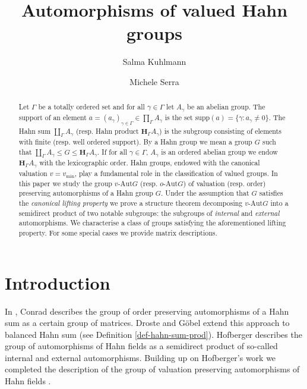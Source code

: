 \documentclass[12pt,a4paper,reqno,openright]{amsart}
\author{Salma Kuhlmann}
\author{Michele Serra}
\title{Automorphisms of valued Hahn groups}
\renewcommand{\1}{\mathbbm{1}}
\theoremstyle{definition}
\theoremstyle{plain}
\theoremstyle{plain}
\theoremstyle{plain}
\theoremstyle{plain}
\theoremstyle{plain}
\theoremstyle{plain}
\theoremstyle{plain}
\theoremstyle{plain}
\theoremstyle{definition}
\theoremstyle{definition}
\theoremstyle{plain}
\theoremstyle{definition}
\theoremstyle{definition}
\theoremstyle{plain}
\theoremstyle{plain}
\theoremstyle{plain}
\begin{document}
\maketitle

\begin{abstract}
Let $ \Gamma $ be a totally ordered set and for all $ \gamma\in\Gamma $ let $ A_\gamma $ be an abelian group. The support of an element $ a=(a_\gamma)_{\gamma\in\Gamma}\in \prod_{\Gamma}A_\gamma $ is the set $ \mathrm{supp} (a) = \{\gamma:a_\gamma\neq 0\}. $
The Hahn sum $ \coprod_\Gamma A_\gamma $ (resp. Hahn product $ \mathbf{H}_\Gamma A_\gamma $) is the subgroup consisting of elements with finite (resp. well ordered support).
By a Hahn group we mean a group $ G $ such that $ \coprod_\Gamma A_\gamma \leq G \leq \mathbf{H}_\Gamma A_\gamma$. If for all $ \gamma\in\Gamma $,  $ A_\gamma $ is an ordered abelian group we endow $ \mathbf{H}_\Gamma A_\gamma $ with the lexicographic order.
Hahn groups, endowed with the canonical valuation $ v = v_{\min} $, play a fundamental role
in the classiﬁcation of valued groups. In this paper we study the group $ v\text{-}\mathrm{Aut} G $ (resp. $ o\text{-}\mathrm{Aut} G$) of valuation (resp. order)
preserving automorphisms of a Hahn group $ G$. Under
the assumption that $ G $ satisﬁes the \textit{canonical lifting property} we
prove a structure theorem decomposing $ v\text{-}\mathrm{Aut} G $ into a semidirect product of two notable subgroups: the subgroups of  \textit{internal} and \textit{external} automorphisms. We characterise
a class of groups satisfying the aforementioned lifting
property. For some special cases we provide matrix descriptions.
\end{abstract}


\section{Introduction}\label{sec:introduction}

In \cite{conrad}, Conrad describes the group of order preserving automorphisms of a Hahn sum as a certain group of matrices. Droste and G\"obel \cite{droste-goebel} extend this approach to balanced Hahn sum (see Definition \ref{def-hahn-sum-prod}). Hofberger \cite{hofbergerthesis} describes the group of automorphisms of Hahn fields as a semidirect product of so-called internal and external automorphisms. Building up on Hofberger's work we completed the description of the group of valuation preserving automorphisms of Hahn fields \cite{ours-fields}.
\end{document}
